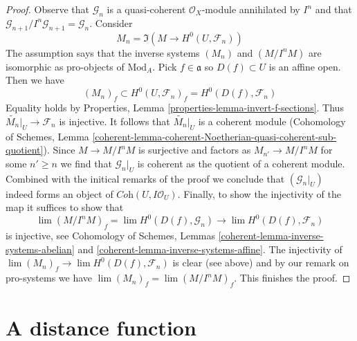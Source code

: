 \begin{proof}
Observe that $\mathcal{G}_n$ is a quasi-coherent $\mathcal{O}_X$-module
annihilated by $I^n$ and that
$\mathcal{G}_{n + 1}/I^n\mathcal{G}_{n + 1} = \mathcal{G}_n$.
Consider
$$
M_n = \Im(M \longrightarrow H^0(U, \mathcal{F}_n))
$$
The assumption says that the inverse systems $(M_n)$ and
$(M/I^nM)$ are isomorphic as pro-objects of $\text{Mod}_A$.
Pick $f \in \mathfrak a$ so $D(f) \subset U$ is an affine open. Then we have
$$
(M_n)_f \subset H^0(U, \mathcal{F}_n)_f = H^0(D(f), \mathcal{F}_n)
$$
Equality holds by Properties, Lemma \ref{properties-lemma-invert-f-sections}.
Thus $\widetilde{M_n}|_U \to \mathcal{F}_n$ is injective.
It follows that $\widetilde{M_n}|_U$ is a coherent module
(Cohomology of Schemes, Lemma
\ref{coherent-lemma-coherent-Noetherian-quasi-coherent-sub-quotient}).
Since $M \to M/I^nM$ is surjective and factors as
$M_{n'} \to M/I^nM$ for some $n' \geq n$ we find that $\mathcal{G}_n|_U$
is coherent as the quotient of a coherent module.
Combined with the initical remarks of the proof we conclude
that $(\mathcal{G}_n|_U)$ indeed forms an object
of $\textit{Coh}(U, I\mathcal{O}_U)$.
Finally, to show the injectivity of the map
it suffices to show that
$$
\lim (M/I^nM)_f = \lim H^0(D(f), \mathcal{G}_n) \to
\lim H^0(D(f), \mathcal{F}_n)
$$
is injective, see Cohomology of Schemes, Lemmas
\ref{coherent-lemma-inverse-systems-abelian} and
\ref{coherent-lemma-inverse-systems-affine}.
The injectivity of $\lim (M_n)_f \to \lim H^0(D(f), \mathcal{F}_n)$
is clear (see above) and by our remark on pro-systems we have
$\lim (M_n)_f = \lim (M/I^nM)_f$. This finishes the proof.
\end{proof}





\section{A distance function}
\label{section-distance}

